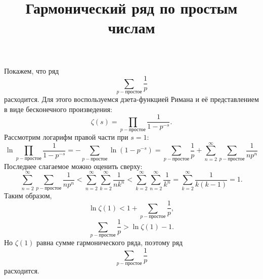 \documentclass{ncc}
\title{Гармонический ряд по простым числам}
\begin{document}
\maketitle
Покажем, что ряд
\begin{equation*}
    \sum_{p-\text{простое}}\frac{1}{p}
\end{equation*}
расходится. Для этого воспользуемся дзета-функцией Римана и её представлением в виде бесконечного произведения:
\begin{equation*}
    \zeta(s) = \prod_{p-\text{простое}}\frac{1}{1-p^{-s}}.
\end{equation*}
Рассмотрим логарифм правой части при \( s = 1 \):
\begin{equation*}
    \ln\prod_{p-\text{простое}}\frac{1}{1-p^{-s}} = -\sum_{p-\text{простое}}\ln\left(1-p^{-s}\right) = \sum_{p-\text{простое}}\frac{1}{p} + \sum_{n=2}^\infty\sum_{p-\text{простое}}\frac{1}{np^n}
\end{equation*}
Последнее слагаемое можно оценить сверху:
\begin{equation*}
    \sum_{n=2}^\infty\sum_{p-\text{простое}}\frac{1}{np^n} <
    \sum_{n=2}^\infty\sum_{k=2}^\infty\frac{1}{nk^n} <
    \sum_{k=2}^\infty\sum_{n=2}^\infty\frac{1}{k^n} =
    \sum_{k=2}^\infty\frac{1}{k(k-1)} = 1.
\end{equation*}
Таким образом,
\begin{equation*}
    \ln\zeta(1) < 1 + \sum_{p-\text{простое}}\frac{1}{p},
\end{equation*}
\begin{equation*}
    \sum_{p-\text{простое}}\frac{1}{p} > \ln\zeta(1) - 1.
\end{equation*}
Но \( \zeta(1) \) равна сумме гармонического ряда, поэтому ряд
\begin{equation*}
    \sum_{p-\text{простое}}\frac{1}{p}
\end{equation*}
расходится.
\end{document}
